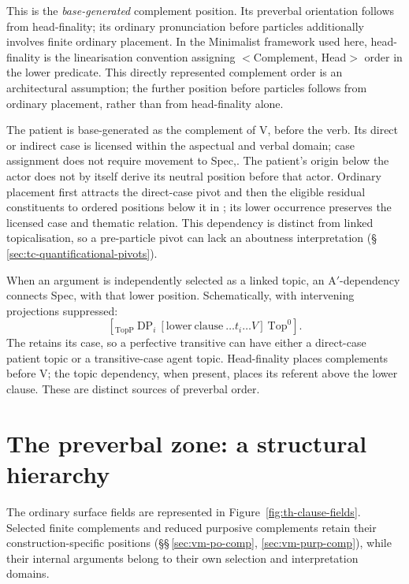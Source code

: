 \noindent This is the \emph{base-generated} complement position. Its
preverbal orientation follows from head-finality; its ordinary pronunciation
before particles additionally involves finite ordinary placement. In the Minimalist
framework used here, head-finality is the linearisation convention assigning
$<$Complement, Head$>$ order in the lower predicate. This directly represented
complement order is an architectural assumption; the further position before
particles follows from ordinary placement, rather than from head-finality
alone.

The patient  is base-generated as the complement of V, before
 the verb. Its direct or indirect case is licensed within the aspectual and
 verbal domain; case assignment does not require movement to
 Spec,. The patient's origin below the actor does not by itself
 derive its neutral position before that actor. Ordinary placement first
 attracts the direct-case pivot and then the eligible residual constituents
 to ordered positions below it in ; its lower occurrence
 preserves the licensed case and thematic relation. This dependency is
 distinct from linked topicalisation, so a pre-particle pivot can lack an
 aboutness interpretation (§\,\ref{sec:tc-quantificational-pivots}).

When an argument is independently selected as a linked topic, an
 A$'$-dependency connects Spec, with that lower position.
 Schematically, with intervening projections suppressed:
\[
 [_{\mathrm{TopP}}\ \mathrm{DP}_{i}\
   [\mathrm{lower\ clause}\ \ldots t_i\ldots V]\ \mathrm{Top}^{0}].
\]
The  retains its case, so a perfective transitive can have either
 a direct-case patient topic or a transitive-case agent topic. Head-finality
 places complements before V; the topic dependency, when present, places its
 referent above the lower clause. These are distinct sources of preverbal
 order.

\section{The preverbal zone: a structural hierarchy}
\label{sec:vm-preverbal-zone}

The ordinary surface fields are represented in Figure~\ref{fig:th-clause-fields}.
Selected finite complements and reduced purposive complements retain their
construction-specific positions (§§\,\ref{sec:vm-po-comp},
\ref{sec:vm-purp-comp}), while their internal arguments belong to their
own selection and interpretation domains.

